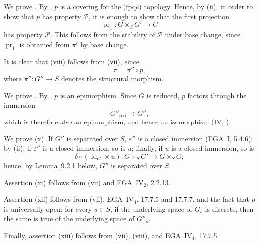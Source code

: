 We prove \textup{}. By \textup{}, \(p\) is a covering for
the \textup{(fpqc)} topology. Hence, by \textup{(ii)}, in order to
show that \(p\) has property \(\mathscr P\), it is enough to show
that the first projection
\[
  \operatorname{pr}_1:G\times_SG'\longrightarrow G
\]
has property \(\mathscr P\). This follows from the stability of
\(\mathscr P\) under base change, since
\(\operatorname{pr}_1\) is obtained from \(\pi'\) by base change.

It is clear that \textup{(viii)} follows from \textup{(vii)}, since
\[
  \pi=\pi''\circ p,
\]
where \(\pi'':G''\to S\) denotes the structural morphism.

We prove \textup{}. By \textup{}, \(p\) is an epimorphism.
Since \(G\) is reduced, \(p\) factors through the immersion
\[
  G''_{\mathrm{red}}\longrightarrow G'',
\]
which is therefore also an epimorphism, and hence an isomorphism
(IV, ).

We prove \textup{(x)}. If \(G''\) is separated over \(S\),
\(\varepsilon''\) is a closed immersion (EGA~I, 5.4.6); by
\textup{(ii)}, if \(\varepsilon''\) is a closed immersion, so is
\(u\); finally, if \(u\) is a closed immersion, so is
\[
  \delta\circ(\operatorname{id}_G\times u):
    G\times_SG'\longrightarrow G\times_SG;
\]
hence, by \hyperref[lem:sga3-VIB-9.2.1]{Lemma~9.2.1 below}, \(G''\) is
separated over \(S\).

Assertion \textup{(xi)} follows from \textup{(vii)} and
EGA~IV\(_2\), 2.2.13.

Assertion \textup{(xii)} follows from \textup{(vii)},
EGA~IV\(_4\), 17.7.5 and 17.7.7, and the fact that \(p\) is
universally open: for every \(s\in S\), if the underlying space of
\(G_s\) is discrete, then the same is true of the underlying space
of \(G''_s\).

Finally, assertion \textup{(xiii)} follows from \textup{(vii)},
\textup{(viii)}, and EGA~IV\(_4\), 17.7.5.
